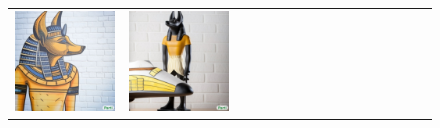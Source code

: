 \begin{figure}
\begin{adjustwidth}{-0.8in}{-0.5in}
\begin{tabular}{cccccccccccccccccccc}
\multicolumn{3}{c}{\includegraphics[width=\twobytwocolwidth\textwidth]{figures/limitations/yellow_anubis1.jpg}} &
\multicolumn{3}{c}{\includegraphics[width=\twobytwocolwidth\textwidth]{figures/limitations/yellow_anubis2.jpg}} &&

\end{tabular}
\end{adjustwidth}
\end{figure}
